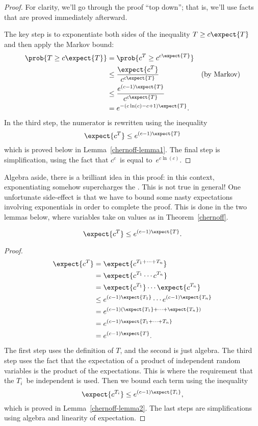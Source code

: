 \begin{proof} 

For clarity, we'll go through the proof ``top down''; that is, we'll
use facts that are proved immediately afterward.

The key step is to exponentiate both sides of the inequality $T \ge c
\expect{T}$ and then apply the Markov bound:
\begingroup
\openup\jot
\begin{align*}
\prob{T \geq c \expect{T}} & = \prob{c^T \geq c^{c \expect{T}}} \\
  & \leq \frac{\expect{c^T}}{c^{c \expect{T}}} & \text{(by Markov)}\\
  & \leq \frac{e^{(c-1) \expect{T}}}{c^{c \expect{T}}} \\
  & = e^{- (c \ln(c) - c + 1) \expect{T}}.
\end{align*}
\endgroup
In the third step, the numerator is rewritten using the inequality
\[
\expect{c^T} \leq e^{(c-1) \expect{T}}
\]
which is proved below in Lemma~\ref{chernoff-lemma1}.  The final step
is simplification, using the fact that $c^c$~is equal to~$e^{c
  \ln(c)}$.
\end{proof}

Algebra aside, there is a brilliant idea in this proof: in this
context, exponentiating somehow supercharges the .
This is not true in general!  One unfortunate side-effect is that we
have to bound some nasty expectations involving exponentials in order
to complete the proof.  This is done in the two lemmas below, where
variables take on values as in Theorem~\ref{chernoff}.

\begin{lemma}
\label{chernoff-lemma1}
\[
    \expect{c^T} \leq e^{(c-1) \expect{T}}.
\]
\end{lemma}

\begin{proof}
\begin{align*}
    \expect{c^T} & = \expect{c^{T_1 + \cdots + T_n}} \\
            & = \expect{c^{T_1} \cdots c^{T_n}} \\
            & = \expect{c^{T_1}}  \cdots \expect{c^{T_n}} \\
            & \leq e^{(c-1) \expect{T_1}} \cdots  e^{(c-1) \expect{T_n}} \\
            & = e^{(c-1) (\expect{T_1} + \cdots + \expect{T_n})} \\
            & = e^{(c-1) \expect{T_1 + \cdots + T_n}} \\
            & = e^{(c-1) \expect{T}}.
\end{align*}
The first step uses the definition of $T$, and the second is just
algebra.  The third step uses the fact that the expectation of a
product of independent random variables is the product of the
expectations.  This is where the requirement that the $T_i$~be
independent is used.  Then we bound each term using the inequality
\[
    \expect{c^{T_i}} \leq e^{(c - 1) \expect{T_i}},
\]
which is proved in Lemma~\ref{chernoff-lemma2}.  The last steps are
simplifications using algebra and linearity of expectation.
\end{proof}

